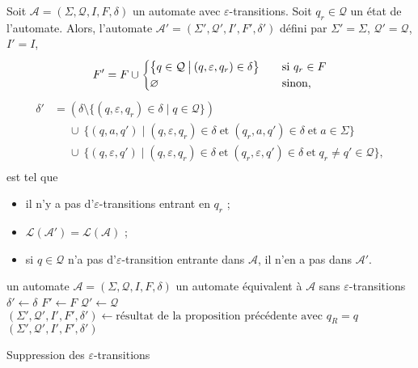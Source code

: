 \begin{prop}
	Soit $\mathcal{A} = (\Sigma, \mathcal{Q}, I, F, \delta)$\/ un automate avec $\varepsilon$-transitions. Soit $q_r \in \mathcal{Q}$\/ un état de l'automate.
	Alors, l'automate $\mathcal{A}' = (\Sigma',\mathcal{Q}',I',F',\delta')$\/ défini par $\Sigma' = \Sigma$, $\mathcal{Q}' = \mathcal{Q}$, $I' = I$, \[
		F' = F \cup \begin{cases}
			\big\{q \in \mathcal{Q}\:\big|\:(q,\varepsilon,q_r) \in \delta\big\}\quad &\text{si } q_r \in F\\
			\varnothing\quad&\text{sinon},
		\end{cases}
	\]
	\begin{align*}
		\delta' &= (\delta \setminus \{(q,\varepsilon, q_r) \in \delta  \mid q \in \mathcal{Q}\})\\
		&\mathrel{\phantom=} \cup\:\{(q,a,q')  \mid  (q, \varepsilon, q_r) \in \delta \mathop{\text{et}} (q_r, a, q') \in \delta \mathop{\text{et}} a \in \Sigma\} \\
		&\mathrel{\phantom=} \cup\:\{(q,\varepsilon,q')  \mid (q,\varepsilon,q_r) \in \delta\mathrel{\text{et}} (q_r, \varepsilon, q') \in \delta \mathrel{\text{et}} q_r \neq q' \in \mathcal{Q}\}, \\
	\end{align*}
	est tel que
	\begin{itemize}
		\item il n'y a pas d'$\varepsilon$-transitions entrant en $q_r$\/ ;
		\item $\mathcal{L}(\mathcal{A}') = \mathcal{L}(\mathcal{A})$\/ ;
		\item si $q \in \mathcal{Q}$\/ n'a pas d'$\varepsilon$-transition entrante dans $\mathcal{A}$, il n'en a pas dans $\mathcal{A}'$.
	\end{itemize}
\end{prop}

\begin{algorithm}[H]
	\centering
	\begin{algorithmic}[1]
		\Entree un automate $\mathcal{A} = (\Sigma, \mathcal{Q}, I, F, \delta)$\/ 
		\Sortie un automate équivalent à $\mathcal{A}$\/ sans $\varepsilon$-transitions
		\State $\delta' \gets \delta$\/
		\State $F' \gets F$\/
		\State $\mathcal{Q}' \gets \mathcal{Q}$\/
		\State $(\Sigma', \mathcal{Q}', I', F', \delta') \gets \text{résultat de la proposition précédente avec } q_R = q$\/ 
		\EndWhile
		\State\Return $(\Sigma', \mathcal{Q}', I', F', \delta')$\/
	\end{algorithmic}
	\caption{Suppression des $\varepsilon$-transitions}
\end{algorithm}

